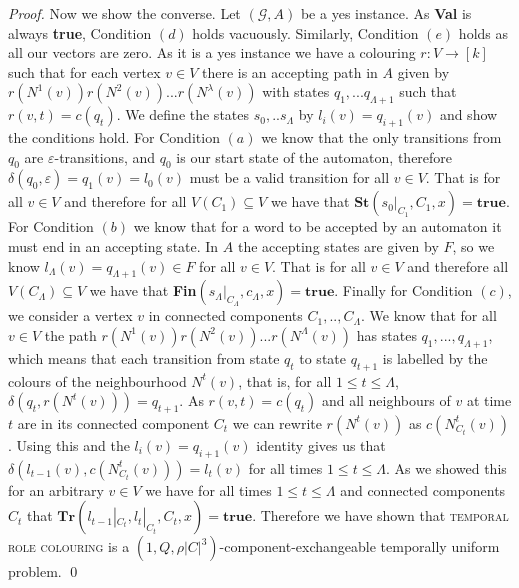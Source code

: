 \documentclass[runningheads]{llncs}
\begin{document}
\begin{proof}
Now we show the converse. Let $(\mathcal{G},A)$ be a yes instance. As \textbf{Val}  is always \textbf{true}, Condition $(d)$ holds vacuously. Similarly, Condition $(e)$ holds as all our vectors are zero. 
As it is a yes instance we have a colouring $r:V \rightarrow [k]$ such that for each vertex $v \in V$ there is an accepting path in $A$ given by $r(N^1(v))r(N^2(v))...r(N^\lambda(v))$  with states $q_1,...q_{\Lambda+1}$ such that $r(v,t)=c(q_t)$. We define the states $s_0,..s_\Lambda$ by $l_i(v)=q_{i+1}(v)$ and show the conditions hold. 
For Condition $(a)$ we know that the only transitions from $q_0$ are $\varepsilon$-transitions, and $q_0$ is our start state of the automaton, therefore $\delta(q_0,\varepsilon)=q_1(v)=l_0(v)$ must be a valid transition for all $v\in V$. That is for all $v\in V$ and therefore for all $V(C_1) \subseteq V$ we have that $\textbf{St}(s_0|_{C_1}, C_1,x) = \textbf{true}$.
For Condition $(b)$ we know that for a word to be accepted by an automaton it must end in an accepting state. In $A$ the accepting states are given by $F$, so we know $l_{\Lambda}(v)=q_{\Lambda+1}(v) \in F$ for all $v \in V$. That is for all $v \in V$ and therefore all $V(C_\Lambda) \subseteq V$ we have that \textbf{Fin}$(s_\Lambda|_{C_\Lambda},c_\Lambda,x)=\textbf{true}$. Finally for Condition $(c)$, we consider a vertex $v$ in connected components $C_1,..,C_\Lambda$. We know that for all $v\in V$ the path $r(N^1(v))r(N^2(v))...r(N^\Lambda(v))$ has states $q_1,...,q_{\Lambda+1}$, which means that each transition from state $q_t$ to state $q_{t+1}$ is labelled by the colours of the neighbourhood $N^t(v)$, that is, for all $1\leq t \leq \Lambda$, $\delta(q_t,r(N^t(v)))=q_{t+1}$. As $r(v,t)=c(q_t)$ and all neighbours of $v$ at time $t$ are in its connected component $C_t$ we can rewrite $r(N^t(v))$ as $c(N_{C_t}^t(v))$. Using this and the $l_i(v)=q_{i+1}(v)$ identity gives us that $\delta(l_{t-1}(v),c(N^t_{C_t}(v)))=l_t(v)$ for all times $1 \leq t \leq \Lambda$. As we showed this for an arbitrary $v\in V$ we have for all times $1\leq t \leq \Lambda$ and connected components $C_t$ that $\textbf{Tr}(l_{t-1}|_{C_t},l_t|_{C_t},C_t,x) = \textbf{true}$.
Therefore we have shown that \textsc{temporal role colouring} is a $(1,Q,\rho|C|^3)$-component-exchangeable temporally uniform problem.
\qed \end{proof}
\end{document}

